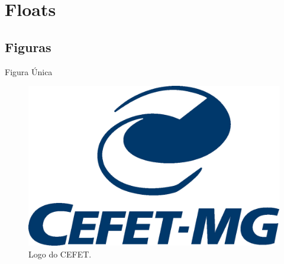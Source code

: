 
\section{Floats}
\subsection{Figuras}

\begin{slide}{Figura Única}
  \begin{figure}[ht!] %
    \centering %
    \includegraphics[height=0.3\textheight]{imgs/cefet}
    \caption{Logo do CEFET.} %
  \end{figure}
\end{slide}

